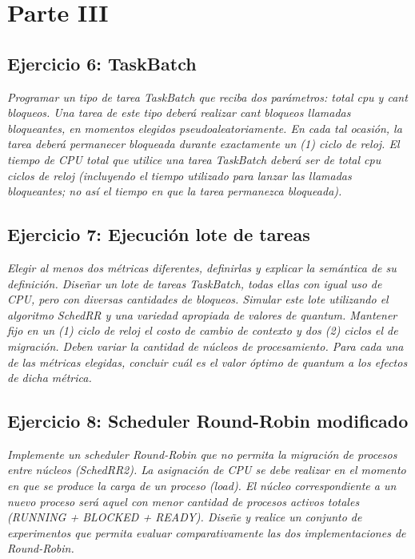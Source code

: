 \documentclass[a4paper]{article}
\begin{document}
\newpage
\section{Parte III}


 \subsection{Ejercicio 6: TaskBatch}
\textit{Programar un tipo de tarea TaskBatch que reciba dos par\'ametros: total cpu y cant bloqueos. Una tarea de este tipo deber\'a realizar cant bloqueos llamadas bloqueantes, en momentos elegidos pseudoaleatoriamente. En cada tal ocasi\'on, la tarea deber\'a permanecer bloqueada durante exactamente un (1) ciclo de reloj. El tiempo de CPU total que utilice una tarea TaskBatch deber\'a ser de total cpu ciclos de reloj (incluyendo el tiempo utilizado para lanzar las llamadas bloqueantes; no as\'i el tiempo en que la tarea permanezca bloqueada).}

 \subsection{Ejercicio 7: Ejecuci\'on lote de tareas}
\textit{Elegir al menos dos m\'etricas diferentes, definirlas y explicar la sem\'antica de su definici\'on. Dise\~nar un lote de tareas TaskBatch, todas ellas con igual uso de CPU, pero con diversas cantidades de bloqueos. Simular este lote utilizando el algoritmo SchedRR y una variedad apropiada de valores de quantum. Mantener fijo en un (1) ciclo de reloj el costo de cambio de contexto y dos (2) ciclos el de migraci\'on. Deben variar la cantidad de n\'ucleos de procesamiento. Para cada una de las m\'etricas elegidas, concluir cu\'al es el valor \'optimo de quantum a los efectos de dicha m\'etrica.}

 \subsection{Ejercicio 8: Scheduler Round-Robin modificado}
\textit{Implemente un scheduler Round-Robin que no permita la migraci\'on de procesos entre n\'ucleos (SchedRR2). La asignaci\'on de CPU se debe realizar en el momento en que se produce la carga de un proceso (load). El n\'ucleo correspondiente a un nuevo proceso ser\'a aquel con menor cantidad de procesos activos totales (RUNNING + BLOCKED + READY). Dise\~ne y realice un conjunto de experimentos que permita evaluar comparativamente las dos implementaciones de Round-Robin.}
\end{document}
